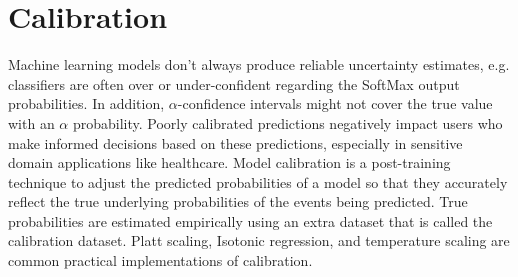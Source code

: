 \section{Calibration}

Machine learning models don't always produce reliable uncertainty estimates, e.g. classifiers are often over or under-confident regarding the SoftMax output probabilities. In addition, $\alpha$-confidence intervals might not cover the true value with an $\alpha$ probability.  %
Poorly calibrated predictions negatively impact users who make informed decisions based on these predictions, especially in sensitive domain applications like healthcare. %
Model calibration is a post-training technique to adjust the predicted probabilities of a model so that they accurately reflect the true underlying probabilities of the events being predicted. True probabilities are estimated empirically using an extra dataset that is called the calibration dataset. Platt scaling\cite{platscaling}, Isotonic regression\cite{isotonicRegression}, and temperature scaling are common practical implementations of calibration. 

